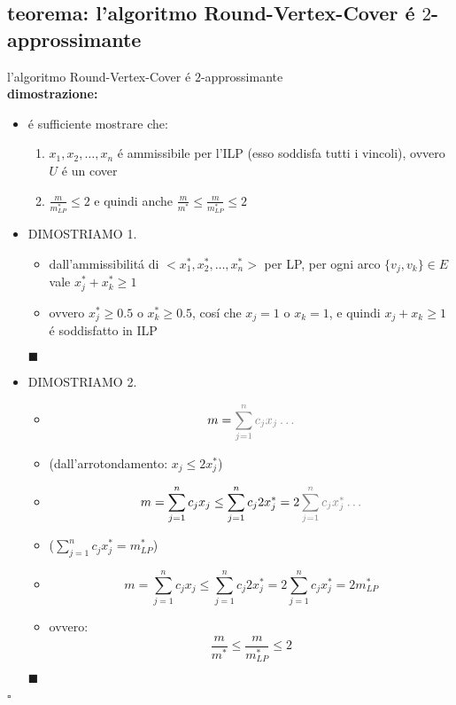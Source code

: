 \subsection*{teorema: l'algoritmo Round-Vertex-Cover \'e $2$-approssimante}
\begin{flushleft}
	l'algoritmo Round-Vertex-Cover \'e $2$-approssimante \newline \\
	\textbf{dimostrazione:}
	\begin{itemize}
		\item \'e sufficiente mostrare che:
		\begin{enumerate}
			\item $x_1,x_2,\ldots,x_n$ \'e ammissibile per l'ILP (esso soddisfa tutti i vincoli), ovvero $U$ \'e un cover
			\item $\frac{m}{m_{LP}^*}\leq 2$ e quindi anche $\frac{m}{m^*}\leq\frac{m}{m_{LP}^*}\leq 2$
		\end{enumerate}
		\item DIMOSTRIAMO 1.
		\begin{itemize}
			\item dall'ammissibilit\'a di $<x_1^*,x_2^*,\ldots,x_n^*>$ per LP, per ogni arco $\{v_j,v_k\}\in E$ vale $x_j^*+x_k^*\geq 1$
			\item ovvero $x_j^*\geq 0.5$ o $x_k^*\geq 0.5$, cos\'i che $x_j=1$ o $x_k=1$, e quindi $x_j+x_k\geq 1$ \'e soddisfatto in ILP
		\end{itemize}
		\hfill$\blacksquare$
		\item DIMOSTRIAMO 2.
		\begin{itemize}
			\item[] $$m=\color{gray}\sum_{j=1}^nc_jx_j\ldots$$
			\item (dall'arrotondamento: $x_j\leq 2x_j^*$)
			\item[] $$m=\sum_{j=1}^nc_jx_j\leq\sum_{j=1}^nc_j2x_j^*=2\color{gray}\sum_{j=1}^nc_jx_j^*\ldots$$
			\item ($\sum_{j=1}^nc_jx_j^*=m_{LP}^*$)
			\item[] $$m=\sum_{j=1}^nc_jx_j\leq\sum_{j=1}^nc_j2x_j^*=2\sum_{j=1}^nc_jx_j^*=2m_{LP}^*$$
			\item ovvero:
				$$\frac{m}{m^*}\leq\frac{m}{m_{LP}^*}\leq 2$$
		\end{itemize}
		\hfill$\blacksquare$
	\end{itemize}
	\hfill$\square$
\end{flushleft}


